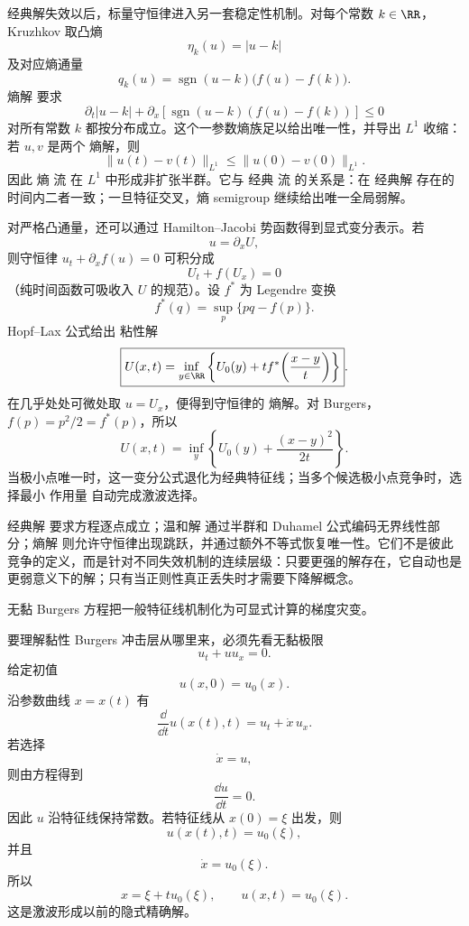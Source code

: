 经典解失效以后，标量守恒律进入另一套稳定性机制。对每个常数 $k\in\RR$，Kruzhkov 取凸熵
\[
\eta_k(u)=|u-k|
\]
及对应熵通量
\[
q_k(u)
=\operatorname{sgn}(u-k)\bigl(f(u)-f(k)\bigr).
\]
熵解 要求
\begin{equation*}\partial_t|u-k|
+\partial_x\!
\left[
\operatorname{sgn}(u-k)(f(u)-f(k))
\right]
\le0\end{equation*}
对所有常数 $k$ 都按分布成立。这个一参数熵族足以给出唯一性，并导出 $L^1$ 收缩：若 $u,v$ 是两个 熵解，则
\begin{equation*}\boxed{
\|u(t)-v(t)\|_{L^1}
\le
\|u(0)-v(0)\|_{L^1}
}.\end{equation*}
因此 熵 流 在 $L^1$ 中形成非扩张半群。它与 经典 流 的关系是：在 经典解 存在的时间内二者一致；一旦特征交叉，熵 semigroup 继续给出唯一全局弱解。

对严格凸通量，还可以通过 Hamilton--Jacobi 势函数得到显式变分表示。若
\[
u=\partial_x U,
\]
则守恒律 $u_t+\partial_xf(u)=0$ 可积分成
\[
U_t+f(U_x)=0
\]
（纯时间函数可吸收入 $U$ 的规范）。设 $f^*$ 为 Legendre 变换
\[
f^*(q)=\sup_p\{pq-f(p)\}.
\]
Hopf--Lax 公式给出 粘性解
\begin{equation*}\boxed{
U(x,t)
=
\inf_{y\in\RR}
\left
\{
U_0(y)
+t f^*\!\left(\frac{x-y}{t}\right)
\right\}
}.\end{equation*}
在几乎处处可微处取 $u=U_x$，便得到守恒律的 熵解。对 Burgers，$f(p)=p^2/2=f^*(p)$，所以
\[
U(x,t)
=
\inf_y\left\{
U_0(y)+\frac{(x-y)^2}{2t}
\right\}.
\]
当极小点唯一时，这一变分公式退化为经典特征线；当多个候选极小点竞争时，选择最小 作用量 自动完成激波选择。

\begin{note}[三种解概念的层级]
经典解 要求方程逐点成立；温和解 通过半群和 Duhamel 公式编码无界线性部分；熵解 则允许守恒律出现跳跃，并通过额外不等式恢复唯一性。它们不是彼此竞争的定义，而是针对不同失效机制的连续层级：只要更强的解存在，它自动也是更弱意义下的解；只有当正则性真正丢失时才需要下降解概念。
\end{note}

无黏 Burgers 方程把一般特征线机制化为可显式计算的梯度灾变。

要理解黏性 Burgers 冲击层从哪里来，必须先看无黏极限
\begin{equation*}\boxed{u_t+u u_x=0}.\end{equation*}
给定初值
\[
u(x,0)=u_0(x).
\]
沿参数曲线 $x=x(t)$ 有
\[
\frac{\dd}{\dd t}u(x(t),t)
=u_t+\dot x\,u_x.
\]
若选择
\[
\dot x=u,
\]
则由方程得到
\[
\frac{\dd u}{\dd t}=0.
\]
因此 $u$ 沿特征线保持常数。若特征线从 $x(0)=\xi$ 出发，则
\[
u(x(t),t)=u_0(\xi),
\]
并且
\[
\dot x=u_0(\xi).
\]
所以
\begin{equation*}\boxed{
x=\xi+t u_0(\xi),
\qquad
u(x,t)=u_0(\xi)
}.\end{equation*}
这是激波形成以前的隐式精确解。

